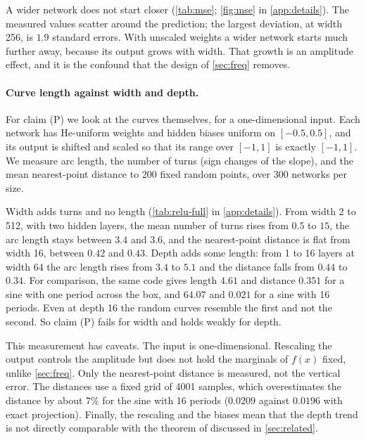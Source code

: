 A wider network does not start closer (\cref{tab:mse}; \cref{fig:mse} in \cref{app:details}). The measured
values scatter around the prediction; the largest deviation, at width 256, is
$1.9$ standard errors. With unscaled weights a wider network starts much further
away, because its output grows with width. That growth is an amplitude effect,
and it is the confound that the design of \cref{sec:freq} removes.

\paragraph{Curve length against width and depth.} For claim (P) we look at the
curves themselves, for a one-dimensional input. Each network has He-uniform
weights and hidden biases uniform on $[-0.5,0.5]$, and its output is shifted and
scaled so that its range over $[-1,1]$ is exactly $[-1,1]$. We measure arc
length, the number of turns (sign changes of the slope), and the mean
nearest-point distance to 200 fixed random points, over 300 networks per size.

Width adds turns and no length (\cref{tab:relu-full} in \cref{app:details}).
From width 2 to 512, with two hidden layers, the mean number of turns rises
from $0.5$ to $15$, the arc length stays between $3.4$ and $3.6$, and the
nearest-point distance is flat from width 16, between $0.42$ and $0.43$. Depth
adds some length: from 1 to 16 layers at width 64 the arc length rises from
$3.4$ to $5.1$ and the distance falls from $0.44$ to $0.34$. For comparison,
the same code gives length $4.61$ and distance $0.351$ for a sine with one
period across the box, and $64.07$ and $0.021$ for a sine with 16 periods. Even
at depth 16 the random curves resemble the first and not the second. So claim
(P) fails for width and holds weakly for depth.

This measurement has caveats. The input is one-dimensional. Rescaling the output
controls the amplitude but does not hold the marginals of $f(x)$ fixed, unlike
\cref{sec:freq}. Only the nearest-point distance is measured, not the vertical
error. The distances use a fixed grid of 4001 samples, which overestimates the
distance by about $7\%$ for the sine with 16 periods ($0.0209$ against $0.0196$
with exact projection). Finally, the rescaling and the biases mean that the
depth trend is not directly comparable with the theorem of
\citet{hanin2022preserve} discussed in \cref{sec:related}.
